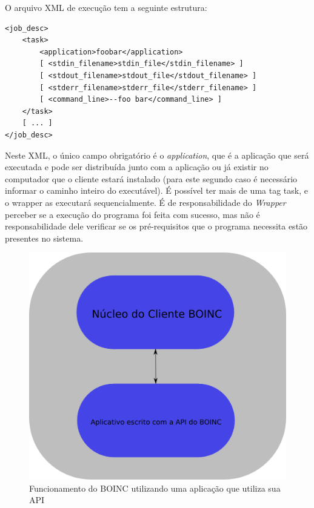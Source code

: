 O arquivo XML de execução tem a seguinte estrutura:

\begin{verbatim}
<job_desc>
    <task>
        <application>foobar</application>
        [ <stdin_filename>stdin_file</stdin_filename> ]
        [ <stdout_filename>stdout_file</stdout_filename> ]
        [ <stderr_filename>stderr_file</stderr_filename> ]
        [ <command_line>--foo bar</command_line> ]
    </task>
    [ ... ]
</job_desc>
\end{verbatim}

Neste XML, o único campo obrigatório é o \emph{application}, que é a aplicação
que será executada e pode ser distribuída junto com a aplicação ou já existir no 
computador que o cliente estará instalado (para este segundo caso é necessário
informar o caminho inteiro do executável). É possível ter mais de uma tag
task, e o wrapper as executará sequencialmente. É de responsabilidade
do \textit{Wrapper} perceber se a execução do programa foi feita com sucesso, 
mas não é responsabilidade dele verificar se os pré-requisitos que o programa necessita
estão presentes no sistema. 


\begin{figure}[!h]
  \centering
  \includegraphics[scale=0.3]{boinc-api.png}
  \caption{Funcionamento do BOINC utilizando uma aplicação que utiliza sua API}
  \label{boinc-api}
\end{figure}


